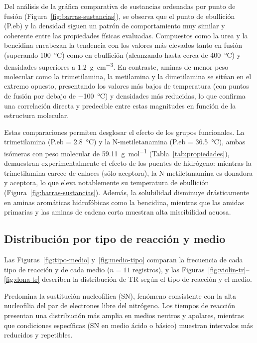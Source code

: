 Del análisis de la gráfica comparativa de sustancias ordenadas por punto de fusión
(Figura~\ref{fig:barras-sustancias}), se observa que el punto de ebullición (P.eb)
y la densidad siguen un patrón de comportamiento muy similar y coherente entre las
propiedades físicas evaluadas. Compuestos como la urea y la bencidina encabezan la
tendencia con los valores más elevados tanto en fusión (superando
\SI{100}{\degreeCelsius}) como en ebullición (alcanzando hasta cerca de
\SI{400}{\degreeCelsius}) y densidades superiores a
\SI{1.2}{\gram\per\centi\metre\cubed}. En contraste, aminas de menor peso
molecular como la trimetilamina, la metilamina y la dimetilamina se sitúan en el
extremo opuesto, presentando los valores más bajos de temperatura (con puntos de
fusión por debajo de \SI{-100}{\degreeCelsius}) y densidades más reducidas, lo que
confirma una correlación directa y predecible entre estas magnitudes en función de
la estructura molecular.

Estas comparaciones permiten desglosar el efecto de los grupos funcionales. La
trimetilamina (P.eb = \SI{2.8}{\degreeCelsius}) y la N-metiletanamina
(P.eb = \SI{36.5}{\degreeCelsius}), ambas isómeras con peso molecular de
\SI{59.11}{\gram\per\mole} (Tabla~\ref{tab:propiedades}), demuestran
experimentalmente el efecto de los puentes de hidrógeno: mientras la trimetilamina
carece de enlaces  (sólo aceptora), la N-metiletanamina es donadora y
aceptora, lo que eleva notablemente su temperatura de ebullición
(Figura~\ref{fig:barras-sustancias}). Además, la solubilidad disminuye
drásticamente en aminas aromáticas hidrofóbicas como la bencidina, mientras que las
amidas primarias y las aminas de cadena corta muestran alta miscibilidad acuosa.

\subsection{Distribución por tipo de reacción y medio}
Las Figuras~\ref{fig:tipo-medio} y~\ref{fig:medio-tipo} comparan la frecuencia de
cada tipo de reacción y de cada medio ($n = 11$ registros), y las
Figuras~\ref{fig:violin-tr}--\ref{fig:dona-tr} describen la distribución de TR
según el tipo de reacción y el medio.

Predomina la sustitución nucleofílica (SN), fenómeno consistente con la alta
nucleofilia del par de electrones libre del nitrógeno. Los tiempos de reacción
presentan una distribución más amplia en medios neutros y apolares, mientras que
condiciones específicas (SN en medio ácido o básico) muestran intervalos más
reducidos y repetibles.

